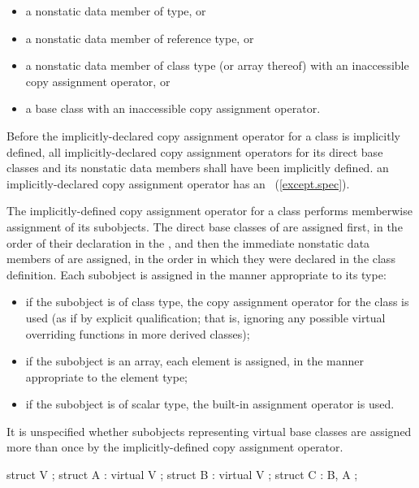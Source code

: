 \begin{itemize}
\item a nonstatic data member of  type, or
\item a nonstatic data member of reference type, or
\item a nonstatic data member of class type (or array thereof) with an
inaccessible copy assignment operator, or
\item a base class with an inaccessible copy assignment operator.
\end{itemize}

Before the implicitly-declared copy assignment operator for a class is
implicitly defined,
all implicitly-declared copy assignment operators for
its direct base classes and
its nonstatic data members shall have been implicitly defined.
\enternote
an implicitly-declared copy assignment operator has an
~(\ref{except.spec}).
\exitnote

\pnum
The implicitly-defined copy assignment operator for a
class  performs memberwise assignment of its subobjects. The direct
base classes of  are assigned first, in the order of their declaration in the
, and then the immediate nonstatic data members of
 are assigned, in the order in which they were declared in the class
definition.
Each subobject is assigned in the manner appropriate to its type:

\begin{itemize}
\item
if the subobject is of class type, the copy assignment operator for the
class is used (as if by explicit qualification; that is,
ignoring any possible virtual overriding functions in more derived classes);
\item
if the subobject is an array, each element is assigned,
in the manner appropriate to the element type;
\item
if the subobject is of scalar type,
the built-in assignment operator is used.
\end{itemize}

%
It is unspecified whether subobjects representing virtual base classes
are assigned more than once by the implicitly-defined copy assignment
operator.
\enterexample

\begin{codeblock}
struct V { };
struct A : virtual V { };
struct B : virtual V { };
struct C : B, A { };
\end{codeblock}

